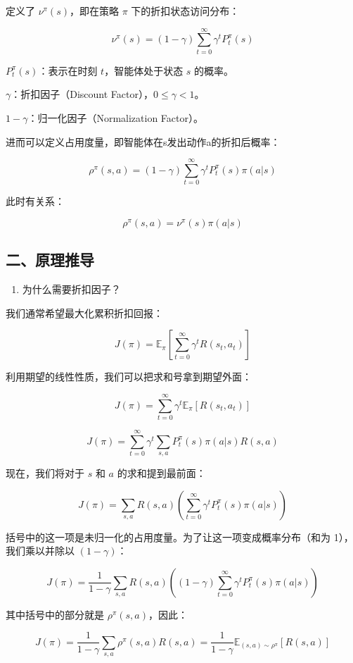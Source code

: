 定义了 \(\nu^\pi(s)\)，即在策略 \(\pi\) 下的折扣状态访问分布：

\[
\nu^\pi(s) = (1-\gamma)\sum_{t=0}^{\infty}\gamma^t P_t^\pi(s)
\]

\(P_t^\pi(s)\)：表示在时刻 \(t\)，智能体处于状态 \(s\) 的概率。

\(\gamma\)：折扣因子（Discount Factor），\(0 \le \gamma < 1\)。

\(1-\gamma\)：归一化因子（Normalization Factor）。

进而可以定义占用度量，即智能体在s发出动作a的折扣后概率：

\[
\rho^\pi(s,a) = (1-\gamma)\sum_{t=0}^{\infty}\gamma^t P_t^\pi(s)\pi(a|s)
\]

此时有关系：

\[
\rho^\pi(s,a) = \nu^\pi(s)\pi(a|s)
\]

\hypertarget{ux4e8cux539fux7406ux63a8ux5bfc}{%
\subsection{二、原理推导}\label{ux4e8cux539fux7406ux63a8ux5bfc}}

\begin{enumerate}
\def\labelenumi{\arabic{enumi}.}
\tightlist
\item
  为什么需要折扣因子？
\end{enumerate}

我们通常希望最大化累积折扣回报：

\[
J(\pi) = \mathbb{E}_\pi\left[\sum_{t=0}^{\infty}\gamma^t R(s_t,a_t)\right]
\]

利用期望的线性性质，我们可以把求和号拿到期望外面：

\[
J(\pi) = \sum_{t=0}^{\infty}\gamma^t\mathbb{E}_\pi[R(s_t,a_t)]
\]

\[
J(\pi) = \sum_{t=0}^{\infty}\gamma^t\sum_{s,a}P_t^\pi(s)\pi(a|s)R(s,a)
\]

现在，我们将对于 \(s\) 和 \(a\) 的求和提到最前面：

\[
J(\pi) = \sum_{s,a}R(s,a)\left(\sum_{t=0}^{\infty}\gamma^t P_t^\pi(s)\pi(a|s)\right)
\]

括号中的这一项是未归一化的占用度量。为了让这一项变成概率分布（和为 1），我们乘以并除以 \((1-\gamma)\)：

\[
J(\pi) = \frac{1}{1-\gamma}\sum_{s,a}R(s,a)\left((1-\gamma)\sum_{t=0}^{\infty}\gamma^t P_t^\pi(s)\pi(a|s)\right)
\]

其中括号中的部分就是 \(\rho^\pi(s,a)\)，因此：

\[
J(\pi) = \frac{1}{1-\gamma}\sum_{s,a}\rho^\pi(s,a)R(s,a) = \frac{1}{1-\gamma}\mathbb{E}_{(s,a)\sim\rho^\pi}[R(s,a)]
\]

